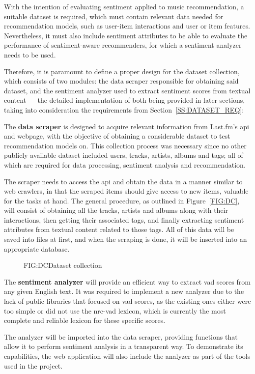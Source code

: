 With the intention of evaluating sentiment applied to music recommendation, a suitable dataset is required, which must contain relevant data needed for recommendation models, such as user-item interactions and user or item features. Nevertheless, it must also include sentiment attributes to be able to evaluate the performance of sentiment-aware recommenders, for which a sentiment analyzer needs to be used.

Therefore, it is paramount to define a proper design for the dataset collection, which consists of two modules: the data scraper responsible for obtaining said dataset, and the sentiment analyzer used to extract sentiment scores from textual content --- the detailed implementation of both being provided in later sections, taking into consideration the requirements from Section~\ref{SS:DATASET_REQ}:

The \textbf{data scraper} is designed to acquire relevant information from Last.fm's \acs{api} and webpage, with the objective of obtaining a considerable dataset to test recommendation models on. This collection process was necessary since no other publicly available dataset included users, tracks, artists, albums and tags; all of which are required for data processing, sentiment analysis and recommendation. 

The scraper needs to access the \acs{api} and obtain the data in a manner similar to web crawlers, in that the scraped items should give access to new items, valuable for the tasks at hand. The general procedure, as outlined in Figure~\ref{FIG:DC}, will consist of obtaining all the tracks, artists and albums along with their interactions, then getting their associated tags, and finally extracting sentiment attributes from textual content related to those tags. All of this data will be saved into files at first, and when the scraping is done, it will be inserted into an appropriate database.

\begin{figure}[Dataset collection]{FIG:DC}{Dataset collection}
\end{figure}

The \textbf{sentiment analyzer} will provide an efficient way to extract \acs{vad} scores from any given English text. It was required to implement a new analyzer due to the lack of public libraries that focused on \acs{vad} scores, as the existing ones either were too simple or did not use the \acs{nrc}-\acs{vad} lexicon, which is currently the most complete and reliable lexicon for these specific scores. 

The analyzer will be imported into the data scraper, providing functions that allow it to perform sentiment analysis in a transparent way. To demonstrate its capabilities, the web application will also include the analyzer as part of the tools used in the project. 
